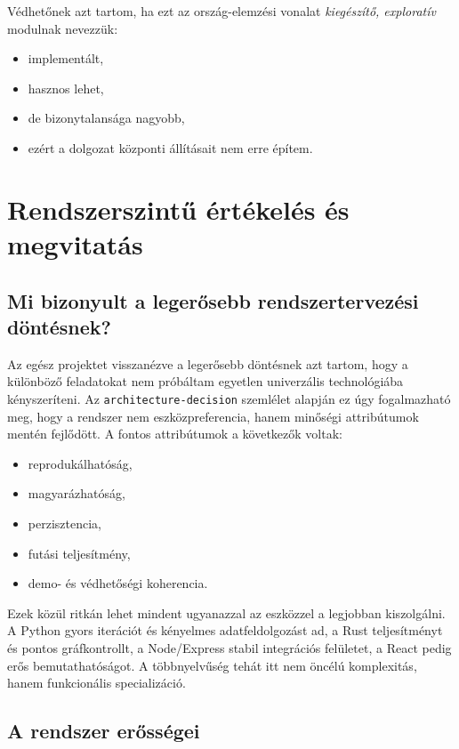 \documentclass[a4paper,12pt]{report}
\begin{document}
Védhetőnek azt tartom, ha ezt az ország-elemzési vonalat \emph{kiegészítő, exploratív} modulnak nevezzük:

\begin{itemize}
    \item implementált,
    \item hasznos lehet,
    \item de bizonytalansága nagyobb,
    \item ezért a dolgozat központi állításait nem erre építem.
\end{itemize}

\chapter{Rendszerszintű értékelés és megvitatás}

\section{Mi bizonyult a legerősebb rendszertervezési döntésnek?}

Az egész projektet visszanézve a legerősebb döntésnek azt tartom, hogy a különböző feladatokat nem próbáltam egyetlen univerzális technológiába kényszeríteni. Az \texttt{architecture-decision} szemlélet alapján ez úgy fogalmazható meg, hogy a rendszer nem eszközpreferencia, hanem minőségi attribútumok mentén fejlődött. A fontos attribútumok a következők voltak:

\begin{itemize}
    \item reprodukálhatóság,
    \item magyarázhatóság,
    \item perzisztencia,
    \item futási teljesítmény,
    \item demo- és védhetőségi koherencia.
\end{itemize}

Ezek közül ritkán lehet mindent ugyanazzal az eszközzel a legjobban kiszolgálni. A Python gyors iterációt és kényelmes adatfeldolgozást ad, a Rust teljesítményt és pontos gráfkontrollt, a Node/Express stabil integrációs felületet, a React pedig erős bemutathatóságot. A többnyelvűség tehát itt nem öncélú komplexitás, hanem funkcionális specializáció.

\section{A rendszer erősségei}
\end{document}
